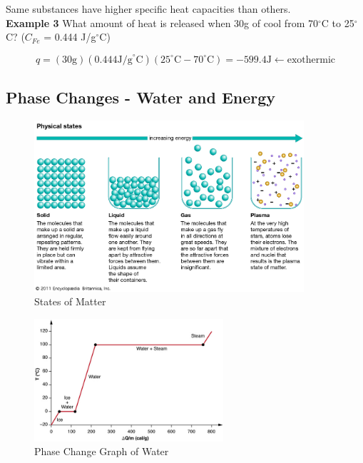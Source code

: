\documentclass[11pt]{article}
\begin{document}
    Same substances have higher specific heat capacities than others. \\

    \textbf{Example 3} What amount of heat is released when 30g of  cool from 70$^\circ$C to 25$^\circ$C? ($C_{Fe}$ = 0.444 J/g$^\circ$C)

    \begin{equation*}
        q = (30\text{g})(0.444 \text{J/g}^\circ \text{C})(25^\circ \text{C} - 70^\circ \text{C}) = -599.4 \text{J} \leftarrow \text{exothermic}
    \end{equation*}

    \newpage
    \subsection{Phase Changes - Water and Energy}

    \begin{figure}[h]
        \begin{center}
        \includegraphics[width=10cm]{States-matter}
        \caption{States of Matter}
        \end{center}
    \end{figure}
    \begin{figure}[h]
        \begin{center}
        \includegraphics[width=7cm]{Phase_change}
        \caption{Phase Change Graph of Water}
        \end{center}
    \end{figure}
\end{document}

